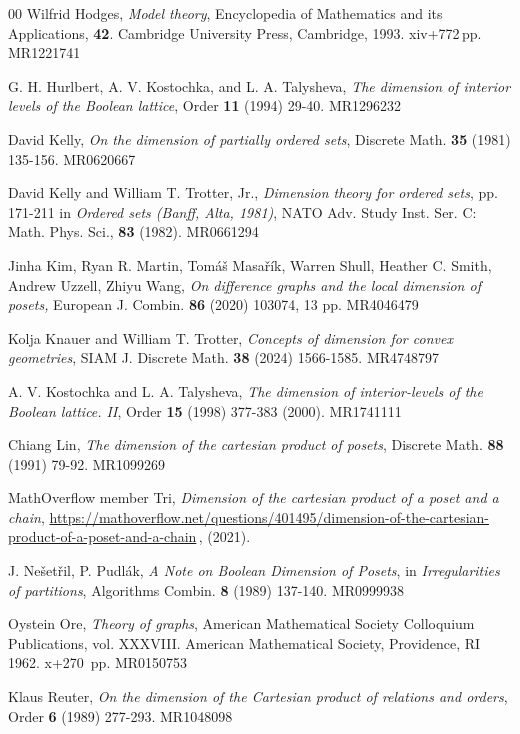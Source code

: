\documentclass{amsart}
\numberwithin{equation}{section}
\numberwithin{theorem}{section}
\newcommand{\2}{\mathbf{2}}
\begin{document}
\begin{thebibliography}{00}
Wilfrid Hodges, {\em Model theory},
Encyclopedia of Mathematics and its Applications, {\bf 42}.
Cambridge University Press, Cambridge, 1993.  xiv+772\,pp.
MR1221741

G. H. Hurlbert, A. V. Kostochka, and L. A. Talysheva,
{\em The dimension of interior levels of the Boolean lattice},
Order {\bf 11} (1994) 29-40.
MR1296232

 David Kelly,
{\em On the dimension of partially ordered sets},
Discrete Math. {\bf 35} (1981) 135-156.
MR0620667

 David Kelly and William T. Trotter, Jr.,
{\em Dimension theory for ordered sets}, pp.\,171-211 in
{\em Ordered sets \textup{(}Banff, Alta, 1981\textup{)}},
NATO Adv. Study Inst. Ser. C: Math. Phys. Sci.,
{\bf 83} (1982).
MR0661294

 Jinha Kim, Ryan R. Martin, Tomáš Masařík, Warren Shull, Heather C.  Smith, Andrew Uzzell, Zhiyu Wang,
{\em On difference graphs and the local dimension of posets,}
European J. Combin. {\bf 86} (2020) 103074, 13 pp.
MR4046479

 Kolja Knauer and William T. Trotter,
{\em Concepts of dimension for convex geometries},
SIAM J. Discrete Math. {\bf 38} (2024) 1566-1585.
MR4748797

 A. V. Kostochka and L. A. Talysheva,
{\em The dimension of interior-levels of the Boolean lattice. II},
Order {\bf 15} (1998) 377-383
(2000).
MR1741111

 Chiang Lin,
{\em The dimension of the cartesian product of posets},
Discrete Math. {\bf 88} (1991) 79-92.
MR1099269

 MathOverflow member Tri,
{\em Dimension of the cartesian product of a poset and a chain},
\url{https://mathoverflow.net/questions/401495/dimension-of-the-cartesian-product-of-a-poset-and-a-chain}\,,
(2021).

 J. Ne\v{s}et\v{r}il, P. Pudl\'{a}k,
{\em A Note on Boolean Dimension of Posets}, in {\em Irregularities of
partitions}, Algorithms Combin. {\bf 8} (1989) 137-140.
MR0999938

 Oystein Ore,
{\em Theory of graphs},
American Mathematical Society Colloquium Publications,
vol. XXXVIII.  American Mathematical Society, Providence, RI
1962. x+270~pp.
MR0150753

 Klaus Reuter,
{\em On the dimension of the Cartesian product of relations and orders},
Order {\bf 6} (1989) 277-293.
MR1048098


\end{thebibliography}
\end{document}
